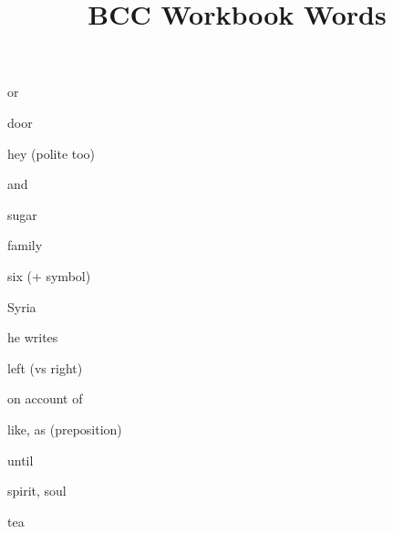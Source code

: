 \documentclass[avery5371,grid,frame]{flashcards}
\title{BCC Workbook Words}
\begin{document}
\begin{flashcard}{\LARGE or}
\LARGE {}
\end{flashcard}
\begin{flashcard}{\LARGE door}
\LARGE {}
\end{flashcard}
\begin{flashcard}{\LARGE hey (polite too)}
\LARGE {}
\end{flashcard}
\begin{flashcard}{\LARGE and}
\LARGE {}
\end{flashcard}
\begin{flashcard}{\LARGE sugar}
\LARGE {}
\end{flashcard}
\begin{flashcard}{\LARGE family}
\LARGE {}
\end{flashcard}
\begin{flashcard}{\LARGE six (+ symbol)}
\LARGE {}
\end{flashcard}
\begin{flashcard}{\LARGE Syria}
\LARGE {}
\end{flashcard}
\begin{flashcard}{\LARGE he writes}
\LARGE {}
\end{flashcard}
\begin{flashcard}{\LARGE left (vs right)}
\LARGE {}
\end{flashcard}
\begin{flashcard}{\LARGE on account of}
\LARGE {}
\end{flashcard}
\begin{flashcard}{\LARGE like, as (preposition)}
\LARGE {}
\end{flashcard}
\begin{flashcard}{\LARGE until}
\LARGE {}
\end{flashcard}
\begin{flashcard}{\LARGE spirit, soul}
\LARGE {}
\end{flashcard}
\begin{flashcard}{\LARGE tea}
\LARGE {}
\end{flashcard}
\end{document}
